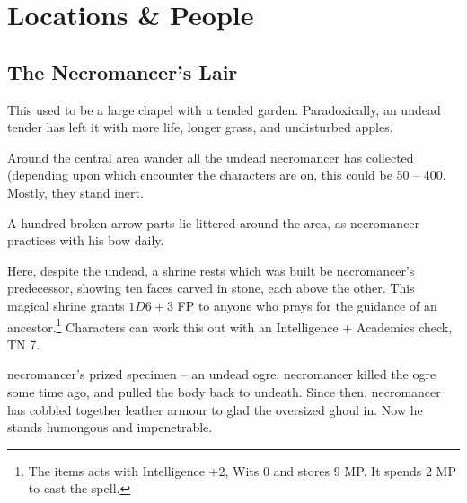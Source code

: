 \section{Locations \& People}

\begin{multicols}{2}

\setcounter{list}{0}

\subsection{The Necromancer's Lair}\label{necromancers_lair}
This used to be a large chapel with a tended garden.  Paradoxically, an undead tender has left it with more life, longer grass, and undisturbed apples.




Around the central area wander all the undead \gls{necromancer} has collected (depending upon which encounter the characters are on, this could be 50 -- 400.  Mostly, they stand inert.

A hundred broken arrow parts lie littered around the area, as \gls{necromancer} practices with his bow daily.


\ghoul


Here, despite the undead, a shrine rests which was built be \gls{necromancer}'s predecessor, showing ten faces carved in stone, each above the other.  This magical shrine grants $1D6 + 3$ FP to anyone who prays for the guidance of an ancestor.\footnote{The items acts with Intelligence +2, Wits 0 and stores 9 MP. It spends 2 MP to cast the spell.}  Characters can work this out with an Intelligence + Academics check, TN 7.


\Gls{necromancer}'s prized specimen -- an undead ogre.
\Gls{necromancer} killed the ogre some time ago, and pulled the body back to undeath.
Since then, \gls{necromancer} has cobbled together leather armour to glad the oversized ghoul in.
Now he stands humongous and impenetrable.


\end{multicols}

